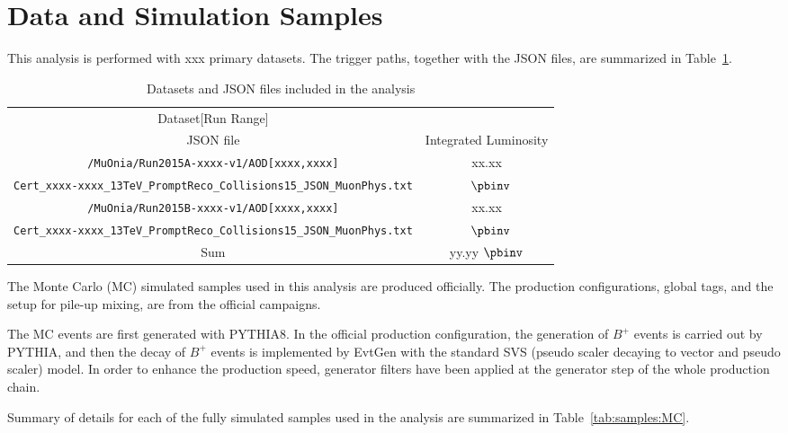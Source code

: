 \section{Data and Simulation Samples}
\label{sec:dataset}

This analysis is performed with xxx primary datasets. 
The trigger paths, together with the JSON files, are summarized in 
Table~\ref{tab:samples:datasets}.

\begin{table}[!Hhbt]
    \centering
    \caption{\small Datasets and JSON files included in the analysis} 
    \label{tab:samples:datasets}
    \begin{tabular}{|c|c|}
        \hline
            {Dataset}{[Run Range]}&{}\\
            {JSON file}&{Integrated Luminosity}\\
        \hline
            \texttt{/MuOnia/Run2015A-xxxx-v1/AOD}\texttt{[xxxx,xxxx]}&{xx.xx}\\
            \texttt{\footnotesize Cert\_xxxx-xxxx\_13TeV\_PromptReco\_Collisions15\_JSON\_MuonPhys.txt}&{$~~\pbinv$}\\
        \hline
            \texttt{/MuOnia/Run2015B-xxxx-v1/AOD}\texttt{[xxxx,xxxx]}&{xx.xx}\\
            \texttt{\footnotesize Cert\_xxxx-xxxx\_13TeV\_PromptReco\_Collisions15\_JSON\_MuonPhys.txt}&{$~~\pbinv$}\\
        \hline
        \hline
        Sum &{yy.yy} $\pbinv$\\
        \hline
    \end{tabular}
\end{table}
\FloatBarrier

The Monte Carlo (MC) simulated samples used in this analysis are produced officially. The production configurations, global tags, and the setup for pile-up mixing, are from the official campaigns.

The MC events are first generated with PYTHIA8. In the official production configuration, the generation of $B^+$ events is carried out by PYTHIA, and then the decay of $B^+$ events is implemented by EvtGen with the standard SVS (pseudo scaler decaying to vector and pseudo scaler) model. In order to enhance the production speed, generator filters have been applied at the generator step of the whole production chain. 

Summary of details for each of the fully simulated samples used in the analysis are summarized in Table~\ref{tab:samples:MC}. 

